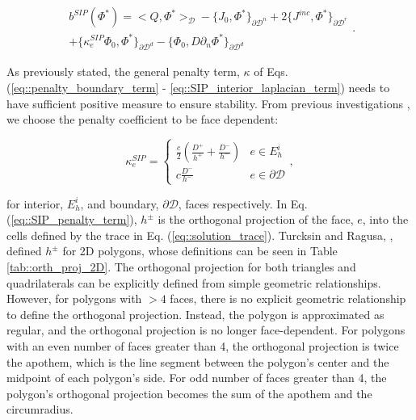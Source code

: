 \begin{equation}
\label{eq::SIP_linear_form}
\begin{aligned}
b^{SIP} (\Phi^*) = \Big<  Q, \Phi^*  \Big>_{\mathcal{D}}  - \Big\{   J_{0}, \Phi^*  \Big\}_{\partial \mathcal{D}^n} +  2 \Big\{   J^{inc}, \Phi^*  \Big\}_{\partial 				\mathcal{D}^r} \\ + \Big\{ \kappa_e^{SIP}   \Phi_0 ,   \Phi^* \Big\}_{\partial \mathcal{D}^d} - \Big\{   \Phi_0  ,  D \partial_n \Phi^* \Big\}_{\partial 					\mathcal{D}^d} 
\end{aligned} .
\end{equation}

\noindent As previously stated, the general penalty term, $\kappa$ of Eqs. (\ref{eq::penalty_boundary_term} - \ref{eq::SIP_interior_laplacian_term}) needs to have sufficient positive measure to ensure stability. From previous investigations \cite{ref::DSA_2D_arb_poly,wang2009adaptive,ref::DSA_wang_ragusa}, we choose the penalty coefficient to be face dependent:

\begin{equation}
\kappa_e^{SIP} = 
\begin{cases}
	\frac{c}{2} \left(  \frac{D^+}{h^+} + \frac{D^-}{h^-} \right) & e \in E_h^i\\ 
	c \frac{D^-}{h^-}& e \in \partial \mathcal{D}
\end{cases},
\label{eq::SIP_penalty_term}
\end{equation}

\noindent for interior, $E_h^i$, and boundary, $\partial \mathcal{D}$, faces respectively. In Eq. (\ref{eq::SIP_penalty_term}), $h^\pm$ is the orthogonal projection of the face, $e$, into the cells defined by the trace in Eq. (\ref{eq::solution_trace}). Turcksin and Ragusa, \cite{turcksin2014discontinuous}, defined $h^\pm$ for 2D polygons, whose definitions can be seen in Table \ref{tab::orth_proj_2D}. The orthogonal projection for both triangles and quadrilaterals can be explicitly defined from simple geometric relationships. However, for polygons with $>4$ faces, there is no explicit geometric relationship to define the orthogonal projection. Instead, the polygon is approximated as regular, and the orthogonal projection is no longer face-dependent. For polygons with an even number of faces greater than 4, the orthogonal projection is twice the apothem, which is the line segment between the polygon's center and the midpoint of each polygon's side. For odd number of faces greater than 4, the polygon's orthogonal projection becomes the sum of the apothem and the circumradius.

